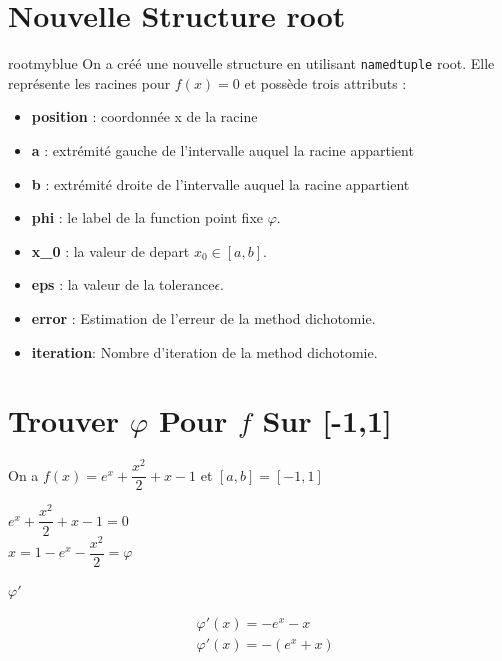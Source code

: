 \section{Nouvelle Structure root}
\begin{prettyBox}{root}{myblue}
On a créé une nouvelle structure en utilisant \texttt{namedtuple} root. Elle représente 
les racines pour \( f(x) = 0 \) et possède trois attributs :
\begin{itemize}
    \item \textbf{position} : coordonnée x de la racine
    \item \textbf{a} : extrémité gauche de l'intervalle auquel la racine appartient
    \item \textbf{b} : extrémité droite de l'intervalle auquel la racine appartient 
    \item \textbf{phi} : le label de la function point fixe \(\varphi\).
    \item \textbf{x\_0} : la valeur de depart \(x_0 \in [a,b]\).
    \item \textbf{eps} : la valeur de la tolerance\(\epsilon\).
    \item \textbf{error} : Estimation de l'erreur de la method dichotomie.
    \item \textbf{iteration}: Nombre d'iteration de la method dichotomie.
\end{itemize}
\end{prettyBox}
\vspace{0.5cm}


\vspace{1cm}
\section{Trouver \(\varphi\) Pour \(f\) Sur [-1,1]}
On a \(f(x) = e^{x} + \dfrac{x^2}{2} + x - 1\) et \([a,b] = [-1,1]\)

\vspace{1cm}
\begin{center}
    \(e^{x} + \dfrac{x^2}{2} + x - 1 = 0\)\\[0.1cm]
    \(\boxed{x  =  1 - e^{x} - \dfrac{x^2}{2} = \varphi}\)\\[0.1cm]
\end{center}

\vspace{1cm}
\textbf{\underline{\(\varphi'\)}}
\begin{center}
    \begin{align*}
        &\varphi'(x) = - e^{x} - x \\[0.15cm]
        &\boxed{\varphi'(x) = - (e^{x} + x)}\\[0.15cm]
    \end{align*}
\end{center}

